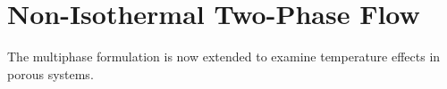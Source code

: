 \section{Non-Isothermal Two-Phase Flow}
The multiphase formulation is now extended to examine temperature effects in porous systems.


